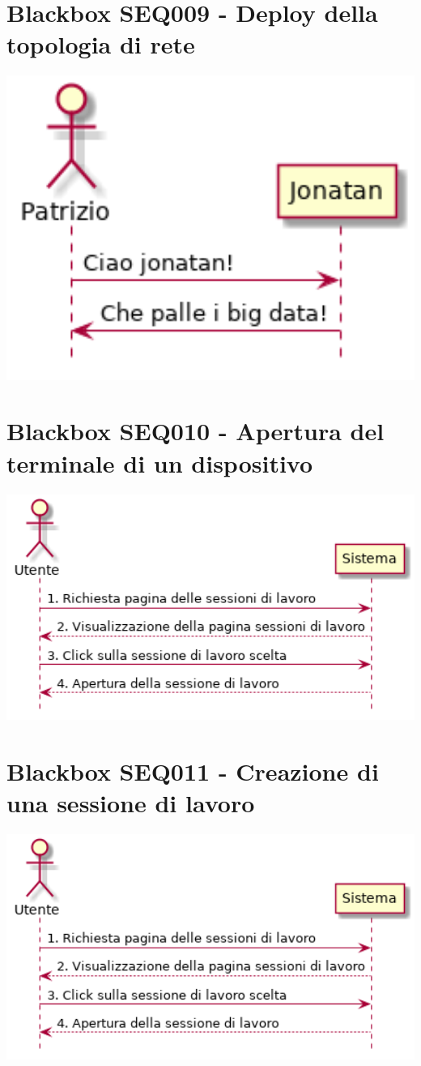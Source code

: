 \documentclass[../main.tex]{subfiles}
\begin{document}
\section{Blackbox SEQ009 - Deploy della topologia di rete }
\figure[H]
\centering
\includegraphics[width=14cm]{capitoli/usecases_diagrams/diagrams/SEQ009.png}
\endfigure
\section{Blackbox SEQ010 - Apertura del terminale di un dispositivo }
\figure[H]
\centering
\includegraphics[width=14cm]{capitoli/usecases_diagrams/diagrams/SEQ010.png}
\endfigure
\section{Blackbox SEQ011 - Creazione di una sessione di lavoro }
\figure[H]
\centering
\includegraphics[width=14cm]{capitoli/usecases_diagrams/diagrams/SEQ011.png}
\endfigure
\end{document}
